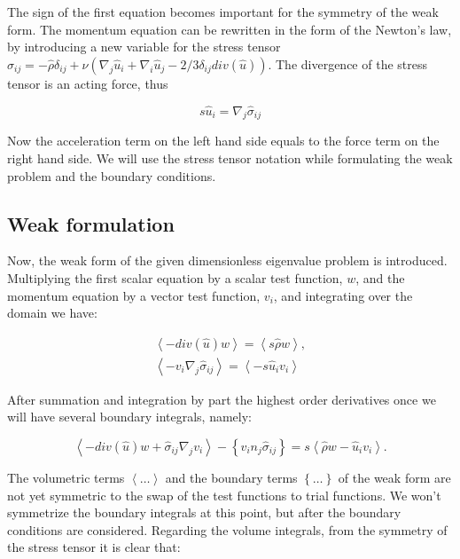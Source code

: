 The sign of the first equation becomes important for the symmetry of the weak form. The momentum equation can be rewritten in the form of the Newton's law, by introducing a new variable for the stress tensor $\hat{\sigma}_{ij} = - \hat{\rho} \delta_{ij} + \nu \left( \nabla_j \hat{u}_i + \nabla_i \hat{u}_j - 2/3 \delta_{ij} div(\hat{u}) \right)$. The divergence of the stress tensor is an acting force, thus 

\begin{equation}
s \hat{u}_i = \nabla_j \hat{\sigma}_{ij}
\end{equation}

Now the acceleration term on the left hand side equals to the force term on the right hand side. We will use the stress tensor notation while formulating the weak problem and the boundary conditions.


\subsection{Weak formulation}

Now, the weak form of the given dimensionless eigenvalue problem is introduced. Multiplying the first scalar equation by a scalar test function, $w$, and the momentum equation by a vector test function, $v_i$, and integrating over the domain we have:

\begin{subequations}
\begin{align}
        \left< -div(\hat{u}) w \right> =\left< s \hat{\rho} w \right>, \\
        \left< - v_i \nabla_j \hat{\sigma}_{ij} \right>= \left<- s \hat{u}_i v_i\right>
\end{align}
\end{subequations}

After summation and integration by part the highest order derivatives once we will have several boundary integrals, namely:

\begin{equation}
\label{eq:AcousGenerWeak}
    \left< - div(\hat{u}) w  + \hat{\sigma}_{ij} \nabla_j v_i \right>  - \left\{ v_i n_j \hat{\sigma}_{ij} \right\} = s \left< \hat{\rho} w - \hat{u}_i v_i \right>.
\end{equation}

The volumetric terms $\left<\dots\right>$  and the boundary terms $\left\{\dots\right\}$ of the weak form are not yet symmetric to the swap of the test functions to trial functions. We won't symmetrize the boundary integrals at this point, but after the boundary conditions are considered. Regarding the volume integrals, from the symmetry of the stress tensor it is clear that:

